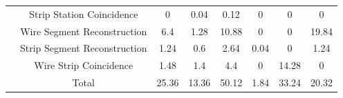 \begin{table}[]
\begin{tabular}{|c|c|c|c|c|c|c|c|}
                                                                                & Strip Station Coincidence    & 0                                                         & 0.04                                                      & 0.12                                                     & 0                                                                 & 0                                                      & 0                                                      \\ \cline{2-8} 
                                                                                & Wire Segment Reconstruction  & 6.4                                                       & 1.28                                                      & 10.88                                                    & 0                                                                 & 0                                                      & 19.84                                                  \\ \cline{2-8} 
                                                                                & Strip Segment Reconstruction & 1.24                                                      & 0.6                                                       & 2.64                                                     & 0.04                                                              & 0                                                      & 1.24                                                   \\ \cline{2-8} 
                                                                                & Wire Strip Coincidence       & 1.48                                                      & 1.4                                                       & 4.4                                                      & 0                                                                 & 14.28                                                  & 0                                                      \\ \cline{2-8} 
                                                                                & Total                        & 25.36                                                     & 13.36                                                     & 50.12                                                    & 1.84                                                              & 33.24                                                  & 20.32                                                  \\ \hline
    \end{tabular}
\end{table}